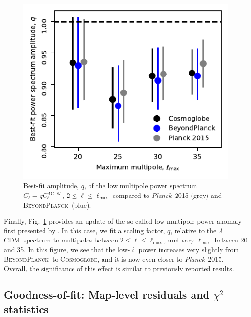 \documentclass[twocolumn]{../../common/aa}
\def\planck{\emph{Planck}}
\def\Planck{\emph{Planck}}
\def\LCDM{$\Lambda$CDM}
\newcommand{\bp}{\textsc{BeyondPlanck}}
\newcommand{\cosmoglobe}{\textsc{Cosmoglobe}}
\begin{document}
\begin{figure}
	\includegraphics[width=\columnwidth]{figures/WMAP_best_q_fit.pdf}
	\caption{Best-fit amplitude, $q$, of the low multipole power spectrum $C_{\ell} = q C^{\Lambda \mathrm{CDM}}_{\ell}$, $2 \leq \ell \leq \ell_{\mathrm{max}}$ compared to \planck\ 2015 (grey) and \bp\ (blue).}
        \label{fig:lowl}
\end{figure}

Finally, Fig.~\ref{fig:lowl} provides an update of the so-called low multipole power anomaly first presented by \citet{planck2014-a13}. In this case, we fit a scaling factor, $q$, relative to the \LCDM\ spectrum to multipoles between $2\le\ell\le\ell_{\mathrm{max}}$, and vary $\ell_{\mathrm{max}}$ between 20 and 35. In this figure, we see that the low-$\ell$ power increases very slightly from \bp\ to \cosmoglobe, and it is now even closer to \Planck\ 2015. Overall, the significance of this effect is similar to previously reported results.



\subsection{Goodness-of-fit: Map-level residuals and $\chi^2$ statistics}\label{subsub:compsep_chisq}
\end{document}
